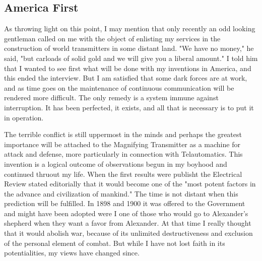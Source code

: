 \documentclass[a4paper,12pt,english,twoside,openright]{memoir}
\begin{document}
\subsection{America First}
As throwing light on this point, I may mention that only recently an odd looking gentleman called 
on me with the object of enlisting my services in the construction of world transmitters in some 
distant land.  "We have no money," he said, "but carloads of solid gold and we will give you a 
liberal amount." I told him that I wanted to see first what will be done with my inventions in 
America, and this ended the interview.  But I am satisfied that some dark forces are at work, and 
as time goes on the maintenance of continuous communication will be rendered more difficult.  
The only remedy is a system immune against interruption.  It has been perfected, it exists, and all 
that is necessary is to put it in operation.  

The terrible conflict is still uppermost in the minds and perhaps the greatest importance will be 
attached to the Magnifying Transmitter as a machine for attack and defense, more particularly in 
connection with Telautomatics.  This invention is a logical outcome of observations begun in my 
boyhood and continued thruout my life.  When the first results were publisht the Electrical Review 
stated editorially that it would become one of the "most potent factors in the advance and 
civilization of mankind." The time is not distant when this prediction will be fulfilled.  In 1898 and 
1900 it was offered to the Government and might have been adopted were I one of those who 
would go to Alexander's shepherd when they want a favor from Alexander.  At that time I really 
thought that it would abolish war, because of its unlimited destructiveness and exclusion of the 
personal element of combat.  But while I have not lost faith in its potentialities, my views have 
changed since.  
\end{document}
